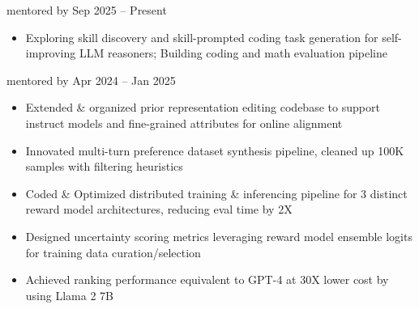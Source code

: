     {{\bodyfontsize \color{body} mentored by} }
    {Sep 2025 -- Present}{}{}
\begin{itemize}
    \item Exploring skill discovery and skill-prompted coding task generation for self-improving LLM reasoners;
    Building coding and math evaluation pipeline
\end{itemize}
\dividerSmall



    {{\bodyfontsize \color{body} mentored by} }
    {Apr 2024 -- Jan 2025}{}{}
\begin{itemize}
    \item Extended \& organized prior 
    representation editing
    codebase to support instruct models and fine-grained attributes for online alignment

    \item Innovated multi-turn preference dataset synthesis pipeline, cleaned up 100K samples with filtering heuristics


    \item Coded \& Optimized distributed training \& inferencing pipeline for 3 distinct reward model architectures, reducing eval time by 2X

    \item Designed uncertainty scoring metrics leveraging reward model ensemble logits for training data curation/selection

    \item Achieved ranking performance equivalent to GPT-4 at 30X lower cost by using Llama 2 7B
\end{itemize}
\dividerSmall


